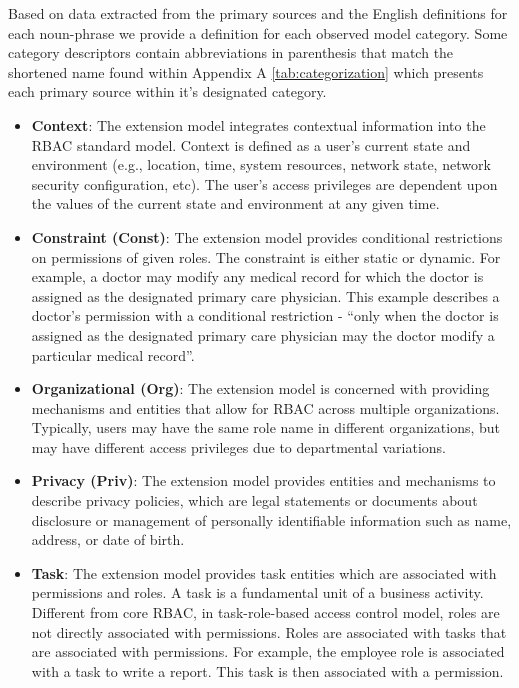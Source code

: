Based on data extracted from the primary sources and the English definitions for each noun-phrase we provide a definition for each observed model category. 
Some category descriptors contain abbreviations in parenthesis that match the shortened name found within Appendix A \ref{tab:categorization} which presents each primary source within it's designated category.

\begin{itemize}

  \item \textbf{Context}: The extension model integrates contextual information into the RBAC standard model. Context is defined as a user's current state and environment (e.g., location, time, system resources, network state, network security configuration, etc). The user's access privileges are dependent upon the values of the current state and environment at any given time.

  \item \textbf{Constraint (Const)}: The extension model provides conditional restrictions on permissions of given roles. The constraint is either static or dynamic. For example, a doctor may modify any medical record for which the doctor is assigned as the designated primary care physician. This example describes a doctor's permission with a conditional restriction - ``only when the doctor is assigned as the designated primary care physician may the doctor modify a particular medical record''.

  \item \textbf{Organizational (Org)}: The extension model is concerned with providing mechanisms and entities that allow for RBAC across multiple organizations. Typically, users may have the same role name in different organizations, but may have different access privileges due to departmental variations.
  
  \item \textbf{Privacy (Priv)}: The extension model provides entities and mechanisms to describe privacy policies, which are legal statements or documents about disclosure or management of personally identifiable information such as name, address, or date of birth.
  
  \item \textbf{Task}: The extension model provides task entities which are associated with permissions and roles. A task is a fundamental unit of a business activity. Different from core RBAC, in task-role-based access control model, roles are not directly associated with permissions. Roles are associated with tasks that are associated with permissions. For example, the employee role is associated with a task to write a report. This task is then associated with a permission.


\end{itemize}
